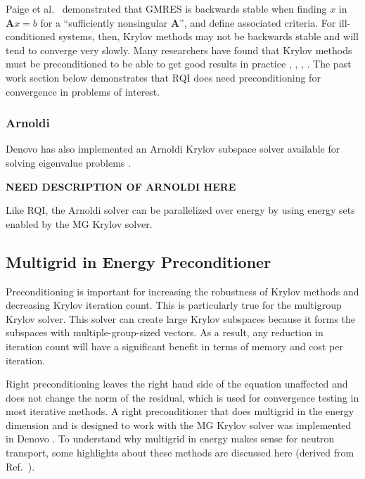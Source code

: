 \documentclass[preprint,12pt]{elsarticle}
\newcommand{\ve}[1]{\ensuremath{\mathbf{#1}}}
\begin{document}
Paige et al.\ \cite{Paige2006} demonstrated that GMRES is backwards stable when finding $x$ in $\ve{A}x = b$ for a ``sufficiently nonsingular $\ve{A}$'', and define associated criteria. For ill-conditioned systems, then, Krylov methods may not be backwards stable and will tend to converge very slowly. Many researchers have found that Krylov methods must be preconditioned to be able to get good results in practice \cite{Benzi2002}, \cite{Saad1986}, \cite{Trefethen1997} , \cite{Paige2006}. The past work section below demonstrates that RQI does need preconditioning for convergence in problems of interest.

\subsubsection{Arnoldi}
Denovo has also implemented an Arnoldi Krylov subspace solver available for solving eigenvalue problems \cite{Davidson2013}. 

\textbf{NEED DESCRIPTION OF ARNOLDI HERE}

Like RQI, the Arnoldi solver can be parallelized over energy by using energy sets enabled by the MG Krylov solver.


\subsection{Multigrid in Energy Preconditioner}
\label{sec:precond}
Preconditioning is important for increasing the robustness of Krylov methods and decreasing Krylov iteration count. This is particularly true for the multigroup Krylov solver. This solver can create large Krylov subspaces because it forms the subspaces with multiple-group-sized vectors. As a result, any reduction in iteration count will have a significant benefit in terms of memory and cost per iteration. 
 
Right preconditioning leaves the right hand side of the equation unaffected and does not change the norm of the residual, which is used for convergence testing in most iterative methods. A right preconditioner that does multigrid in the energy dimension and is designed to work with the MG Krylov solver was implemented in Denovo \cite{Slaybaugh2013}. To understand why multigrid in energy makes sense for neutron transport, some highlights about these methods are discussed here (derived from Ref.\ \cite{Briggs2000}). 
\end{document}
